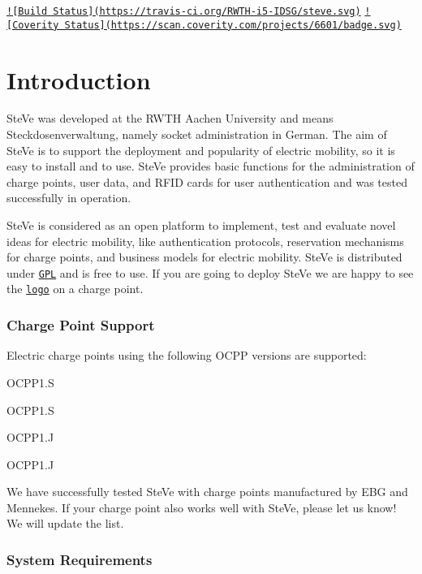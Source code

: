 

\href{https://travis-ci.org/RWTH-i5-IDSG/steve}{\tt !\mbox{[}Build Status\mbox{]}(https\-://travis-\/ci.\-org/\-R\-W\-T\-H-\/i5-\/\-I\-D\-S\-G/steve.\-svg)} \href{https://scan.coverity.com/projects/rwth-i5-idsg-steve}{\tt !\mbox{[}Coverity Status\mbox{]}(https\-://scan.\-coverity.\-com/projects/6601/badge.\-svg)}

\section*{Introduction}

Ste\-Ve was developed at the R\-W\-T\-H Aachen University and means Steckdosenverwaltung, namely socket administration in German. The aim of Ste\-Ve is to support the deployment and popularity of electric mobility, so it is easy to install and to use. Ste\-Ve provides basic functions for the administration of charge points, user data, and R\-F\-I\-D cards for user authentication and was tested successfully in operation.

Ste\-Ve is considered as an open platform to implement, test and evaluate novel ideas for electric mobility, like authentication protocols, reservation mechanisms for charge points, and business models for electric mobility. Ste\-Ve is distributed under \href{LICENSE.txt}{\tt G\-P\-L} and is free to use. If you are going to deploy Ste\-Ve we are happy to see the \href{website/logo/managed-by-steve.pdf}{\tt logo} on a charge point.

\subsubsection*{Charge Point Support}

Electric charge points using the following O\-C\-P\-P versions are supported\-:


\begin{DoxyItemize}
\item O\-C\-P\-P1.\-S
\item O\-C\-P\-P1.\-S
\item O\-C\-P\-P1.\-J
\item O\-C\-P\-P1.\-J
\end{DoxyItemize}

We have successfully tested Ste\-Ve with charge points manufactured by E\-B\-G and Mennekes. If your charge point also works well with Ste\-Ve, please let us know! We will update the list.

\subsubsection*{System Requirements}

